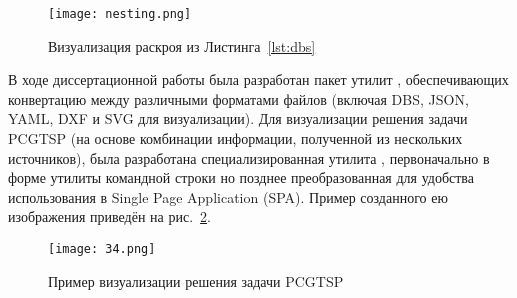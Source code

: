 \begin{figure}
  \centering
  \texttt{[image: nesting.png]}
  \caption{Визуализация раскроя из Листинга~\ref{lst:dbs}}
  \label{fig:nesting}
\end{figure}

В ходе диссертационной работы
была разработан пакет утилит
\cite{bi:dbs2json},
обеспечивающих конвертацию между
различными форматами файлов
(включая DBS, JSON, YAML, DXF и SVG для визуализации).
Для визуализации решения задачи PCGTSP
(на основе комбинации информации,
полученной из нескольких источников),
была разработана специализированная утилита
\cite{bi:j2pcgtsp},
первоначально в форме утилиты командной строки
но позднее преобразованная
для удобства использования в
Single Page Application
(SPA).
Пример созданного ею изображения
приведён на рис.~\ref{fig:pcgtsp.svg}.

\begin{figure}
  \centering
  \texttt{[image: 34.png]}
  \caption{Пример визуализации решения задачи PCGTSP}
  \label{fig:pcgtsp.svg}
\end{figure}
